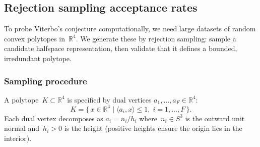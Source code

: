 %
%
%

\subsection{Rejection sampling acceptance rates}
\label{sec:rejection-sampling}

To probe Viterbo's conjecture computationally, we need large datasets of
random convex polytopes in~$\mathbb{R}^4$. We generate these by rejection
sampling: sample a candidate halfspace representation, then validate that it
defines a bounded, irredundant polytope.

\subsubsection*{Sampling procedure}

A polytope~$K \subset \mathbb{R}^4$ is specified by dual vertices
$a_1, \ldots, a_F \in \mathbb{R}^4$:
\[
  K = \bigl\{\, x \in \mathbb{R}^4 \;\big|\; \langle a_i, x \rangle \le 1,\;
  i = 1, \ldots, F \,\bigr\}.
\]
Each dual vertex decomposes as $a_i = n_i / h_i$ where~$n_i \in S^3$ is the
outward unit normal and~$h_i > 0$ is the height
(positive heights ensure the origin lies in the interior).

